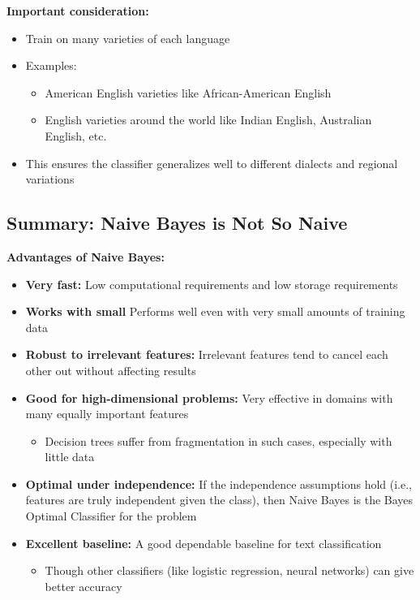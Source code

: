 \documentclass[11pt,a4paper]{article}
\theoremstyle{definition}
\theoremstyle{plain}
\theoremstyle{remark}
\begin{document}
\textbf{Important consideration:}
\begin{itemize}
    \item Train on many varieties of each language
    \item Examples:
    \begin{itemize}
        \item American English varieties like African-American English
        \item English varieties around the world like Indian English, Australian English, etc.
    \end{itemize}
    \item This ensures the classifier generalizes well to different dialects and regional variations
\end{itemize}

\subsection{Summary: Naive Bayes is Not So Naive}

\textbf{Advantages of Naive Bayes:}

\begin{itemize}
    \item \textbf{Very fast:} Low computational requirements and low storage requirements
    
    \item \textbf{Works with small } Performs well even with very small amounts of training data
    
    \item \textbf{Robust to irrelevant features:} Irrelevant features tend to cancel each other out without affecting results
    
    \item \textbf{Good for high-dimensional problems:} Very effective in domains with many equally important features
    \begin{itemize}
        \item Decision trees suffer from fragmentation in such cases, especially with little data
    \end{itemize}
    
    \item \textbf{Optimal under independence:} If the independence assumptions hold (i.e., features are truly independent given the class), then Naive Bayes is the Bayes Optimal Classifier for the problem
    
    \item \textbf{Excellent baseline:} A good dependable baseline for text classification
    \begin{itemize}
        \item Though other classifiers (like logistic regression, neural networks) can give better accuracy
    \end{itemize}
\end{itemize}
\end{document}

